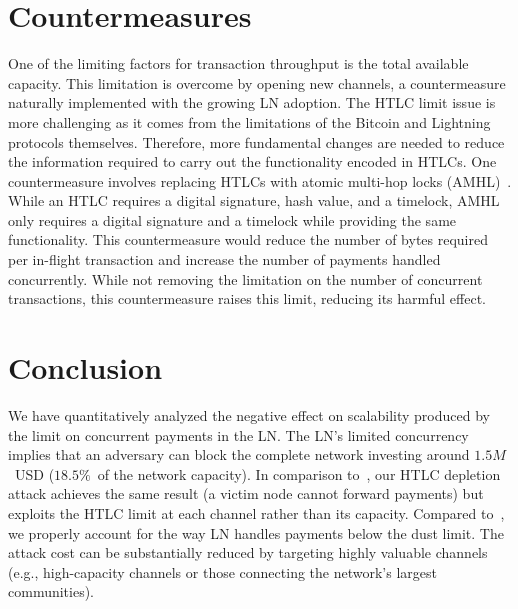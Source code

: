 \section{Countermeasures}
One of the limiting factors for transaction throughput is the total available capacity.
This limitation is overcome by opening new channels, a countermeasure naturally implemented with the growing LN adoption.
The HTLC limit issue is more challenging as it comes from the limitations of the Bitcoin and Lightning protocols themselves.
Therefore, more fundamental changes are needed to reduce the information required to carry out the functionality encoded in HTLCs.
One countermeasure involves replacing HTLCs with atomic multi-hop locks (AMHL)~\cite{Malavolta2019}.
While an HTLC requires a digital signature, hash value, and a timelock, AMHL only requires a digital signature and a timelock while providing the same functionality.
This countermeasure would reduce the number of bytes required per in-flight transaction and increase the number of payments handled concurrently.
While not removing the limitation on the number of concurrent transactions, this countermeasure raises this limit, reducing its harmful effect.


\section{Conclusion}

We have quantitatively analyzed the negative effect on scalability produced by the limit on concurrent payments in the LN\@.
The LN's limited concurrency implies that an adversary can block the complete network investing around $1.5M$~USD ($18.5\%$~of the network capacity).
In comparison to~\cite{PerezSola2019}, our HTLC depletion attack achieves the same result (a victim node cannot forward payments) but exploits the HTLC limit at each channel rather than its capacity.
Compared to~\cite{Mizrahi2020}, we properly account for the way LN handles payments below the dust limit.
The attack cost can be substantially reduced by targeting highly valuable channels (e.g., high-capacity channels or those connecting the network's largest communities).
